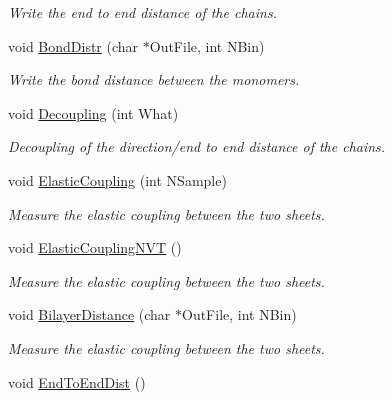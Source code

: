 \begin{DoxyCompactItemize}
\begin{DoxyCompactList}\small\item\em Write the end to end distance of the chains. \end{DoxyCompactList}\item 
void \hyperlink{classElPoly_af5a6c502bd65553e3f5e98577081ec66}{Bond\+Distr} (char $\ast$Out\+File, int N\+Bin)\hypertarget{classElPoly_af5a6c502bd65553e3f5e98577081ec66}{}\label{classElPoly_af5a6c502bd65553e3f5e98577081ec66}

\begin{DoxyCompactList}\small\item\em Write the bond distance between the monomers. \end{DoxyCompactList}\item 
void \hyperlink{classElPoly_a44e20767e332d941b94906f1a8e60e24}{Decoupling} (int What)\hypertarget{classElPoly_a44e20767e332d941b94906f1a8e60e24}{}\label{classElPoly_a44e20767e332d941b94906f1a8e60e24}

\begin{DoxyCompactList}\small\item\em Decoupling of the direction/end to end distance of the chains. \end{DoxyCompactList}\item 
void \hyperlink{classElPoly_a48968ddc44376e55852e9720b3827ebe}{Elastic\+Coupling} (int N\+Sample)
\begin{DoxyCompactList}\small\item\em Measure the elastic coupling between the two sheets. \end{DoxyCompactList}\item 
void \hyperlink{classElPoly_ab88192e9e4e0f11b68ad828d73ff8957}{Elastic\+Coupling\+N\+VT} ()
\begin{DoxyCompactList}\small\item\em Measure the elastic coupling between the two sheets. \end{DoxyCompactList}\item 
void \hyperlink{classElPoly_a6f1477b110e5ee0e7e027466dac51b69}{Bilayer\+Distance} (char $\ast$Out\+File, int N\+Bin)\hypertarget{classElPoly_a6f1477b110e5ee0e7e027466dac51b69}{}\label{classElPoly_a6f1477b110e5ee0e7e027466dac51b69}

\begin{DoxyCompactList}\small\item\em Measure the elastic coupling between the two sheets. \end{DoxyCompactList}\item 
void \hyperlink{classElPoly_a9152ea7044fdfac4a1def898c1c21a9d}{End\+To\+End\+Dist} ()\hypertarget{classElPoly_a9152ea7044fdfac4a1def898c1c21a9d}{}\label{classElPoly_a9152ea7044fdfac4a1def898c1c21a9d}


\end{DoxyCompactItemize}
